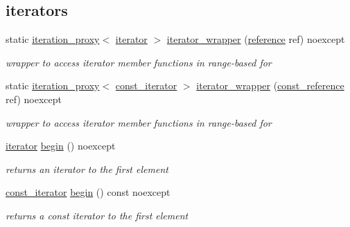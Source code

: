 \subsection*{iterators}
\begin{DoxyCompactItemize}
\item 
static \hyperlink{classnlohmann_1_1basic__json_ae2ce7eec3ae7e7b903e0344e89f0512b}{iteration\+\_\+proxy}$<$ \hyperlink{classnlohmann_1_1basic__json_aa549b2b382916b3baafb526e5cb410bd}{iterator} $>$ \hyperlink{classnlohmann_1_1basic__json_a22e2e5b0e68d9d7c63be2cada5187259}{iterator\+\_\+wrapper} (\hyperlink{classnlohmann_1_1basic__json_a220ae98554a76205fb7f8822d36b2d5a}{reference} ref) noexcept
\begin{DoxyCompactList}\small\item\em wrapper to access iterator member functions in range-\/based for \end{DoxyCompactList}\item 
static \hyperlink{classnlohmann_1_1basic__json_ae2ce7eec3ae7e7b903e0344e89f0512b}{iteration\+\_\+proxy}$<$ \hyperlink{classnlohmann_1_1basic__json_aebd2cfa7e4ded4e97cde9269bfeeea38}{const\+\_\+iterator} $>$ \hyperlink{classnlohmann_1_1basic__json_a3710ff8c5a1cbedb4f75b700a8962d5c}{iterator\+\_\+wrapper} (\hyperlink{classnlohmann_1_1basic__json_ab8a1c33ee7b154fc41ca2545aa9724e6}{const\+\_\+reference} ref) noexcept
\begin{DoxyCompactList}\small\item\em wrapper to access iterator member functions in range-\/based for \end{DoxyCompactList}\item 
\hyperlink{classnlohmann_1_1basic__json_aa549b2b382916b3baafb526e5cb410bd}{iterator} \hyperlink{classnlohmann_1_1basic__json_a23b495b4c282e4afacf382f5b49af7c7}{begin} () noexcept
\begin{DoxyCompactList}\small\item\em returns an iterator to the first element \end{DoxyCompactList}\item 
\hyperlink{classnlohmann_1_1basic__json_aebd2cfa7e4ded4e97cde9269bfeeea38}{const\+\_\+iterator} \hyperlink{classnlohmann_1_1basic__json_a4f147be16fcde9f510c4aac89ab511c9}{begin} () const noexcept
\begin{DoxyCompactList}\small\item\em returns a const iterator to the first element \end{DoxyCompactList}\item 

\end{DoxyCompactItemize}
